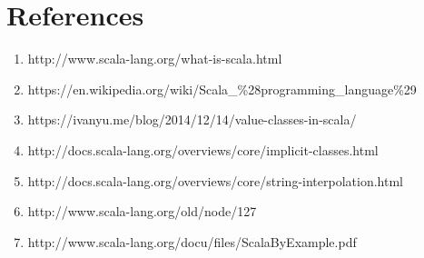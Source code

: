\documentclass[12pt]{article}
\begin{document}
\section{References}
	\begin{enumerate}
		\item
			http://www.scala-lang.org/what-is-scala.html
		\item
			https://en.wikipedia.org/wiki/Scala\_\%28programming\_language\%29
		\item
			https://ivanyu.me/blog/2014/12/14/value-classes-in-scala/
		\item 
			http://docs.scala-lang.org/overviews/core/implicit-classes.html
		\item
			http://docs.scala-lang.org/overviews/core/string-interpolation.html
		\item
			http://www.scala-lang.org/old/node/127
		\item
			    http://www.scala-lang.org/docu/files/ScalaByExample.pdf
	\end{enumerate}
\end{document}
